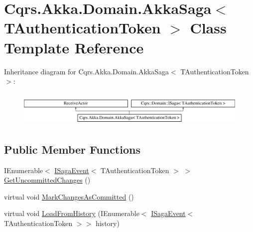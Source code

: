 \hypertarget{classCqrs_1_1Akka_1_1Domain_1_1AkkaSaga}{}\section{Cqrs.\+Akka.\+Domain.\+Akka\+Saga$<$ T\+Authentication\+Token $>$ Class Template Reference}
\label{classCqrs_1_1Akka_1_1Domain_1_1AkkaSaga}
Inheritance diagram for Cqrs.\+Akka.\+Domain.\+Akka\+Saga$<$ T\+Authentication\+Token $>$\+:\begin{figure}[H]
\begin{center}
\leavevmode
\includegraphics[height=1.696970cm]{classCqrs_1_1Akka_1_1Domain_1_1AkkaSaga}
\end{center}
\end{figure}
\subsection*{Public Member Functions}
\begin{DoxyCompactItemize}
\item 
I\+Enumerable$<$ \hyperlink{interfaceCqrs_1_1Events_1_1ISagaEvent}{I\+Saga\+Event}$<$ T\+Authentication\+Token $>$ $>$ \hyperlink{classCqrs_1_1Akka_1_1Domain_1_1AkkaSaga_ac88061e29e3e2223db31ce9075835b46_ac88061e29e3e2223db31ce9075835b46}{Get\+Uncommitted\+Changes} ()
\item 
virtual void \hyperlink{classCqrs_1_1Akka_1_1Domain_1_1AkkaSaga_a83269fac4653cca097461e924feaea7f_a83269fac4653cca097461e924feaea7f}{Mark\+Changes\+As\+Committed} ()
\item 
virtual void \hyperlink{classCqrs_1_1Akka_1_1Domain_1_1AkkaSaga_a40b859bc15c2f7c87a21b07f9bc9548c_a40b859bc15c2f7c87a21b07f9bc9548c}{Load\+From\+History} (I\+Enumerable$<$ \hyperlink{interfaceCqrs_1_1Events_1_1ISagaEvent}{I\+Saga\+Event}$<$ T\+Authentication\+Token $>$$>$ history)
\end{DoxyCompactItemize}
